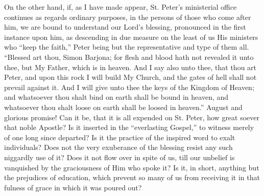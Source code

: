 On the other hand, if, as I have made appear, St. Peter's ministerial
office continues as regards ordinary purposes, in the persons of those
who come after him, we are bound to understand our Lord's blessing,
pronounced in the first instance upon him, as descending in due measure
on the least of us His ministers who ``keep the faith,'' Peter
being but the representative and type of them all. ``Blessed art
thou, Simon Barjona; for flesh and blood hath not revealed it unto thee,
but My Father, which is in heaven. And I say also unto thee, that thou
art Peter, and upon this rock I will build My Church, and the gates of
hell shall not prevail against it. And I will give unto thee the keys of
the Kingdom of Heaven; and whatsoever thou shalt bind on earth shall be
bound in heaven, and whatsoever thou shalt loose on earth shall be
loosed in heaven.'' August and glorious promise! Can it be, that it
is all expended on St. Peter, how great soever that noble Apostle? Is it
inserted in the ``everlasting Gospel,'' to witness merely of one
long since departed? Is it the practice of the inspired word to exalt
individuals? Does not the very exuberance of the blessing resist any
such niggardly use of it? Does it not flow over in spite of us, till our
unbelief is vanquished by the graciousness of Him who spoke it? Is it,
in short, anything but the prejudices of education, which prevent so
many of us from receiving it in that fulness of grace in which it was
poured out?

